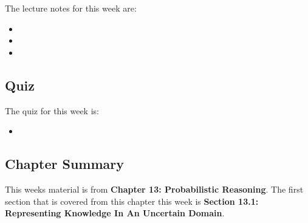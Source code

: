 \noindent The lecture notes for this week are:

\begin{itemize}
    \item {}
    \item {}
    \item {}
\end{itemize}

\subsection{Quiz}

The quiz for this week is:

\begin{itemize}
    \item {}
\end{itemize}

\newpage

\subsection{Chapter Summary}

This weeks material is from \textbf{Chapter 13: Probabilistic Reasoning}. The first section that is covered from this chapter this week is \textbf{Section 13.1: Representing Knowledge In An Uncertain Domain}.

